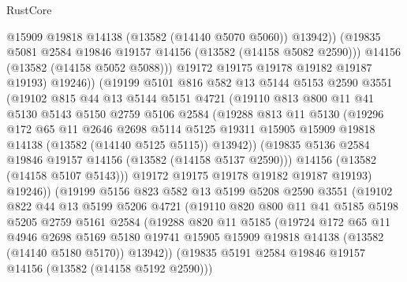 \begin{lexlean}{RustCore}
\begin{coremodule}
                    @15909
                    @19818
                    @14138
                    (@13582 (@14140 @5070 @5060))
                    @13942))
                (@19835 @5081 @2584 @19846 @19157 @14156 (@13582 (@14158 @5082 @2590)))
                @14156
                (@13582 (@14158 @5052 @5088)))
              @19172
              @19175
              @19178
              @19182
              @19187
              @19193)
            @19246))
        (@19199
          @5101
          @816
          @582
          @13
          @5144
          @5153
          @2590
          @3551
          (@19102
            @815
            @44
            @13
            @5144
            @5151
            @4721
            (@19110
              @813
              @800
              @11
              @41
              @5130
              @5143
              @5150
              @2759
              @5106
              @2584
              (@19288
                @813
                @11
                @5130
                (@19296
                  @172
                  @65
                  @11
                  @2646
                  @2698
                  @5114
                  @5125
                  @19311
                  @15905
                  @15909
                  @19818
                  @14138
                  (@13582 (@14140 @5125 @5115))
                  @13942))
              (@19835 @5136 @2584 @19846 @19157 @14156 (@13582 (@14158 @5137 @2590)))
              @14156
              (@13582 (@14158 @5107 @5143)))
            @19172
            @19175
            @19178
            @19182
            @19187
            @19193)
          @19246))
      (@19199
        @5156
        @823
        @582
        @13
        @5199
        @5208
        @2590
        @3551
        (@19102
          @822
          @44
          @13
          @5199
          @5206
          @4721
          (@19110
            @820
            @800
            @11
            @41
            @5185
            @5198
            @5205
            @2759
            @5161
            @2584
            (@19288
              @820
              @11
              @5185
              (@19724
                @172
                @65
                @11
                @4946
                @2698
                @5169
                @5180
                @19741
                @15905
                @15909
                @19818
                @14138
                (@13582 (@14140 @5180 @5170))
                @13942))
            (@19835 @5191 @2584 @19846 @19157 @14156 (@13582 (@14158 @5192 @2590)))

\end{coremodule}
\end{lexlean}
